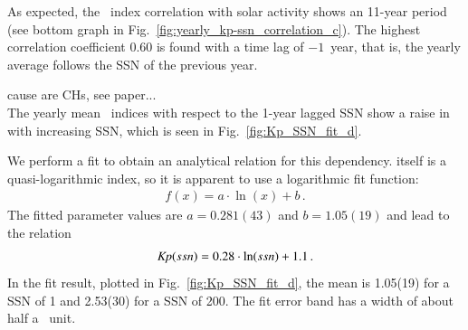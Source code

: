 As expected, the \Kp{}~index correlation with solar activity shows an 11-year period (see bottom graph in Fig.~\ref{fig:yearly_kp-ssn_correlation_c}). The highest correlation coefficient 0.60 is found with a time lag of $-1$~year, that is, the yearly average \Kp{} follows the SSN of the previous year.

cause are CHs, see paper...\\

The yearly mean \Kp~indices with respect to the 1-year lagged SSN show a raise in \Kp{} with increasing SSN, which is seen in Fig.~\ref{fig:Kp_SSN_fit_d}.
\begin{figure}
\end{figure}

We perform a fit to obtain an analytical relation for this dependency. \Kp{} itself is a quasi-logarithmic index, so it is apparent to use a logarithmic fit function:
\begin{align}
	f(x) = a \cdot \ln(x) + b	\,.	\label{eq:log_fit_function}
\end{align}
The fitted parameter values are $a = 0.281(43)$ and $b = 1.05(19)$ and lead to the relation
\begin{align}
	\textit{Kp}(ssn) = 0.28 \cdot \ln(ssn) + 1.1	\,.
\end{align}
In the fit result, plotted in Fig.~\ref{fig:Kp_SSN_fit_d}, the mean \Kp{} is 1.05(19) for a SSN of 1 and 2.53(30) for a SSN of 200. The fit error band has a width of about half a \Kp~unit.\\


